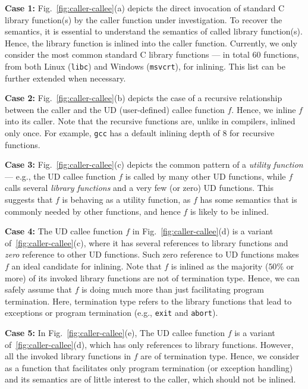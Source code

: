 \noindent\textbf{Case 1:} Fig.~\ref{fig:caller-callee}(a) depicts the direct invocation of standard C library function(s) by the caller function under investigation. To recover the semantics, it is essential to understand the semantics of called library function(s). Hence, the library function is inlined into the caller function.  Currently, we only consider the most common standard C library functions --- in total 60 functions,
from both Linux (\texttt{libc}) and Windows (\texttt{msvcrt}), for inlining. This list can be further extended when necessary.

\noindent\textbf{Case 2:} Fig.~\ref{fig:caller-callee}(b) depicts the case of a recursive relationship between the caller and the UD (user-defined) callee function $f$. Hence, we inline $f$ into its caller. Note that the recursive functions are, unlike in compilers, inlined only once. For example, \texttt{gcc} has a default inlining depth of 8 for recursive functions.

\noindent\textbf{Case 3:} Fig.~\ref{fig:caller-callee}(c) depicts the common pattern of a \textit{utility function} --- e.g., the UD callee function $f$ is called by many other UD functions, while $f$ calls several \textit{library functions} and a very few (or zero) UD functions. This suggests that $f$ is behaving as a utility function, as $f$ has some semantics that is commonly needed by other functions, and hence $f$ is likely to be inlined.

\noindent\textbf{Case 4:} The UD callee function $f$ in Fig.~\ref{fig:caller-callee}(d) is a variant of~\ref{fig:caller-callee}(c), where it has several references to library functions and \textit{zero} reference to other UD functions. Such zero reference to UD functions makes $f$
an ideal candidate for inlining. Note that $f$ is inlined as the majority ($50\%$ or more) of its invoked library functions are not of termination type. Hence, we can safely assume that $f$ is doing much more than just facilitating program termination. Here, termination type refers to the library functions that lead to exceptions or program termination (e.g., \texttt{exit} and \texttt{abort}).

\noindent\textbf{Case 5:} In Fig.~\ref{fig:caller-callee}(e), The UD callee function $f$ is a variant of~\ref{fig:caller-callee}(d), which has only references to library functions.
However,  all the invoked library functions in $f$ are of termination type. Hence, we consider as a function that facilitates only program termination (or exception handling) and its semantics are of little interest to the caller, which should not be inlined.

